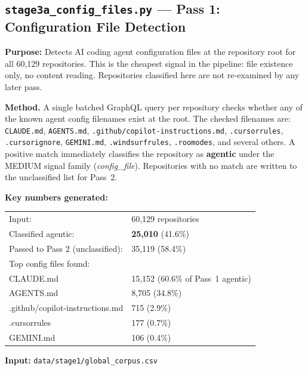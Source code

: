 \documentclass[11pt,a4paper]{article}
\begin{document}
\subsection*{\texttt{stage3a\_config\_files.py} --- Pass 1: Configuration File Detection}

\begin{infobox}
\textbf{Purpose:} Detects AI coding agent configuration files at the
repository root for all 60,129 repositories. This is the cheapest signal
in the pipeline: file existence only, no content reading. Repositories
classified here are not re-examined by any later pass.
\end{infobox}

\textbf{Method.}
A single batched GraphQL query per repository checks whether any of the
known agent config filenames exist at the root. The checked filenames are:
\texttt{CLAUDE.md}, \texttt{AGENTS.md}, \texttt{.github/copilot-instructions.md},
\texttt{.cursorrules}, \texttt{.cursorignore}, \texttt{GEMINI.md},
\texttt{.windsurfrules}, \texttt{.roomodes}, and several others.
A positive match immediately classifies the repository as
\textbf{agentic} under the MEDIUM signal family (\textit{config\_file}).
Repositories with no match are written to the unclassified list for Pass~2.

\begin{numbersbox}
\textbf{Key numbers generated:}\\[2pt]
\begin{tabular}{@{}ll@{}}
Input:                               & 60,129 repositories \\
Classified agentic:                  & \textbf{25,010} (41.6\%) \\
Passed to Pass 2 (unclassified):     & 35,119 (58.4\%) \\[4pt]
Top config files found: & \\
\quad CLAUDE.md                      & 15,152 \quad (60.6\% of Pass~1 agentic) \\
\quad AGENTS.md                      & 8,705 \quad (34.8\%) \\
\quad .github/copilot-instructions.md & 715 \quad (2.9\%) \\
\quad .cursorrules                   & 177 \quad (0.7\%) \\
\quad GEMINI.md                      & 106 \quad (0.4\%) \\
\end{tabular}
\end{numbersbox}

\textbf{Input:} \texttt{data/stage1/global\_corpus.csv}
\end{document}
